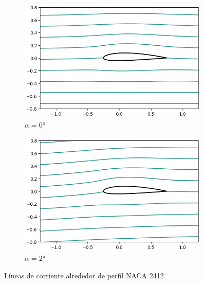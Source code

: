 \documentclass[letterpaper, openright, 12pt]{book}
\begin{document}
\begin{figure}[htbp!]
\begin{subfigure}[c]{0.48\textwidth}
            \includegraphics[keepaspectratio, width=0.99\textwidth]
                {./img/potential_flow_2412_stream_0}
            \caption{$\alpha = 0\si{\degree}$}
            \label{fig:potential_flow_2412_stream_0}
        \end{subfigure}
        \hfill
        \begin{subfigure}[c]{0.48\textwidth}
            \includegraphics[keepaspectratio, width=0.99\textwidth]
                {./img/potential_flow_2412_stream_2}
            \caption{$\alpha = 2\si{\degree}$}
            \label{fig:potential_flow_2412_stream_2}
        \end{subfigure}
        \caption{Líneas de corriente alrededor de perfil NACA 2412}
        \label{fig:potential_flow_2412_stream__0}
    \end{figure}
\end{document}
